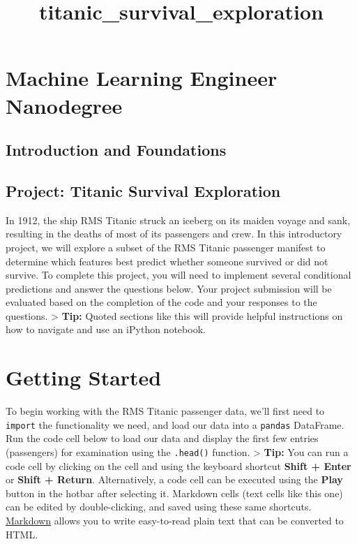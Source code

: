\documentclass[11pt]{article}
\title{titanic\_survival\_exploration}
\begin{document}
    
    
    \maketitle
    
    

    
    \section{Machine Learning Engineer
Nanodegree}\label{machine-learning-engineer-nanodegree}

\subsection{Introduction and
Foundations}\label{introduction-and-foundations}

\subsection{Project: Titanic Survival
Exploration}\label{project-titanic-survival-exploration}

In 1912, the ship RMS Titanic struck an iceberg on its maiden voyage and
sank, resulting in the deaths of most of its passengers and crew. In
this introductory project, we will explore a subset of the RMS Titanic
passenger manifest to determine which features best predict whether
someone survived or did not survive. To complete this project, you will
need to implement several conditional predictions and answer the
questions below. Your project submission will be evaluated based on the
completion of the code and your responses to the questions.
\textgreater{} \textbf{Tip:} Quoted sections like this will provide
helpful instructions on how to navigate and use an iPython notebook.

    \section{Getting Started}\label{getting-started}

To begin working with the RMS Titanic passenger data, we'll first need
to \texttt{import} the functionality we need, and load our data into a
\texttt{pandas} DataFrame.\\
Run the code cell below to load our data and display the first few
entries (passengers) for examination using the \texttt{.head()}
function. \textgreater{} \textbf{Tip:} You can run a code cell by
clicking on the cell and using the keyboard shortcut \textbf{Shift +
Enter} or \textbf{Shift + Return}. Alternatively, a code cell can be
executed using the \textbf{Play} button in the hotbar after selecting
it. Markdown cells (text cells like this one) can be edited by
double-clicking, and saved using these same shortcuts.
\href{http://daringfireball.net/projects/markdown/syntax}{Markdown}
allows you to write easy-to-read plain text that can be converted to
HTML.
\end{document}
